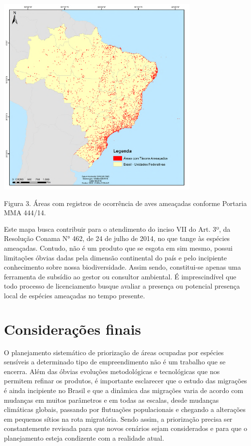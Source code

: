 \documentclass[
]{scrbook}
\begin{document}
\begin{center}\includegraphics[width=0.8\linewidth]{imagens/figura03} \end{center}

Figura 3. Áreas com registros de ocorrência de aves ameaçadas conforme Portaria MMA 444/14.

Este mapa busca contribuir para o atendimento do inciso VII do Art. 3º, da Resolução Conama N° 462, de 24 de julho de 2014, no que tange às espécies ameaçadas. Contudo, não é um produto que se esgota em sim mesmo, possui limitações óbvias dadas pela dimensão continental do país e pelo incipiente conhecimento sobre nossa biodiversidade. Assim sendo, constitui-se apenas uma ferramenta de subsídio ao gestor ou consultor ambiental. É imprescindível que todo processo de licenciamento busque avaliar a presença ou potencial presença local de espécies ameaçadas no tempo presente.

\hypertarget{cons-finais}{%
\section{Considerações finais}\label{cons-finais}}

O planejamento sistemático de priorização de áreas ocupadas por espécies sensíveis a determinado tipo de empreendimento não é um trabalho que se encerra. Além das óbvias evoluções metodológicas e tecnológicas que nos permitem refinar os produtos, é importante esclarecer que o estudo das migrações é ainda incipiente no Brasil e que a dinâmica das migrações varia de acordo com mudanças em muitos parâmetros e em todas as escalas, desde mudanças climáticas globais, passando por flutuações populacionais e chegando a alterações em pequenos sítios na rota migratória. Sendo assim, a priorização precisa ser constantemente revisada para que novos cenários sejam considerados e para que o planejamento esteja condizente com a realidade atual.
\end{document}
